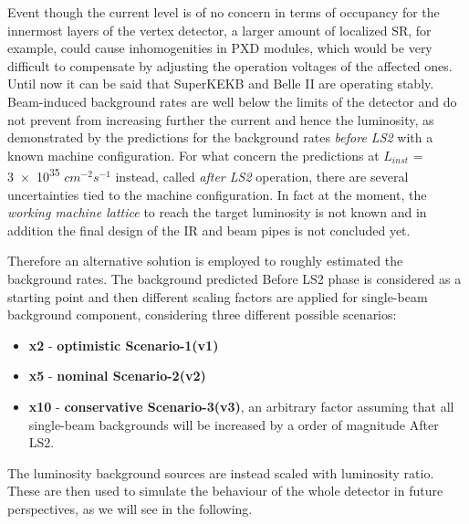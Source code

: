 \begin{comment}
\begin{figure}[h!]
\centering
\texttt{[image: bkg\_table]}
\caption{Background rate limits for Belle II detector sub-systems. The third column shows the total measured background rate in June 2021.}
\label{fig:bkg_table}
\end{figure}
\end{comment}

Event though the current level is of no concern in terms of occupancy for the innermost layers of the vertex detector, a larger amount of localized SR, for example, could cause inhomogenities in PXD modules, which would be very difficult to compensate by adjusting the operation voltages of the affected ones.\\

Until now it can be said that SuperKEKB and Belle II are operating stably. Beam-induced background rates are well below the limits of the detector and do not prevent from increasing further the current and hence the luminosity, as demonstrated by the predictions for the background rates \textit{before LS2} with a known machine configuration. 
For what concern the predictions at \textit{$L_{inst}$} = \num{3e35} $cm^{-2}s^{-1}$ instead, called \textit{after LS2} operation, there are several uncertainties tied to the machine configuration. In fact at the moment, the \emph{working machine lattice} to reach the target luminosity is not known and in addition the final design of the IR and beam pipes is not concluded yet.

Therefore an alternative solution is employed to roughly estimated the background rates. The background predicted Before LS2 phase is considered as a starting point and then different scaling factors are applied for single-beam background component, considering three different possible scenarios:

\begin{itemize}
\item \textbf{x2} - \textbf{optimistic Scenario-1(v1)}
\item \textbf{x5} - \textbf{nominal Scenario-2(v2)}
\item \textbf{x10} - \textbf{conservative Scenario-3(v3)}, an arbitrary factor assuming that all single-beam backgrounds will be increased by a order of magnitude After LS2.
\end{itemize}

The luminosity background sources are instead scaled with luminosity ratio.
These are then used to simulate the behaviour of the whole detector in future perspectives, as we will see in the following.

